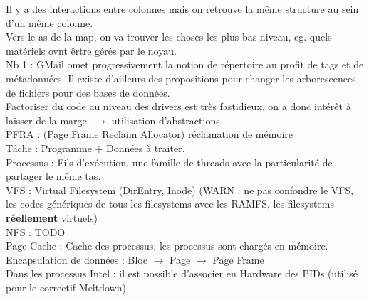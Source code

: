 Il y a des interactions entre colonnes mais on retrouve la même structure au sein
d'un même colonne.\\
Vers le as de la map, on va trouver les choses les plus bas-niveau, eg. quels
matériels ovnt êrtre gérés par le noyau.\\
Nb 1 : GMail omet progressivement la notion de répertoire au profit de tags et de
métadonnées. Il existe d'aiileurs des propositions pour changer les arborescences
de fichiers pour des bases de données.\\
Factoriser du code au niveau des drivers est très fastidieux, on a donc intérêt à
laisser de la marge. $\rightarrow$ utilisation d'abstractions\\
PFRA : (Page Frame Reclaim Allocator) réclamation de mémoire\\
Tâche : Programme + Données à traiter.\\
Processus : Fils d'exécution, une famille de threads avec la particularité de
partager le même tas.\\
VFS : Virtual Filesystem (DirEntry, Inode) (WARN : ne pas confondre le VFS, les
codes génériques de tous les filesystems avec les RAMFS, les filesystems
{\bf réellement} virtuels)\\
NFS : TODO \\
Page Cache : Cache des processus, les processus sont chargés en mémoire.\\
Encapsulation de données : Bloc $\rightarrow$ Page $\rightarrow$ Page Frame\\
Dans les processus Intel : il est possible d'associer en Hardware des PIDs (utilisé
pour le correctif Meltdown)
